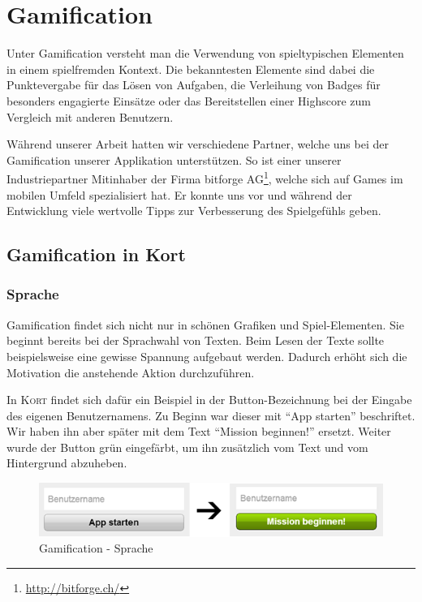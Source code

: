 \chapter{Gamification}
\label{gamification}

Unter Gamification versteht man die Verwendung von spieltypischen Elementen in einem spielfremden Kontext.
Die bekanntesten Elemente sind dabei die Punktevergabe für das Lösen von Aufgaben, die Verleihung von Badges für besonders engagierte Einsätze oder das Bereitstellen einer Highscore zum Vergleich mit anderen Benutzern.

Während unserer Arbeit hatten wir verschiedene Partner, welche uns bei der Gamification unserer Applikation unterstützen.
So ist einer unserer Industriepartner Mitinhaber der Firma bitforge AG\footnote{\url{http://bitforge.ch/}}, welche sich auf Games im mobilen Umfeld spezialisiert hat.
Er konnte uns vor und während der Entwicklung viele wertvolle Tipps zur Verbesserung des Spielgefühls geben.

\section{Gamification in Kort}
\subsection{Sprache}
Gamification findet sich nicht nur in schönen Grafiken und Spiel-Elementen.
Sie beginnt bereits bei der Sprachwahl von Texten.
Beim Lesen der Texte sollte beispielsweise eine gewisse Spannung aufgebaut werden.
Dadurch erhöht sich die Motivation die anstehende Aktion durchzuführen.

In \textsc{Kort} findet sich dafür ein Beispiel in der Button-Bezeichnung bei der Eingabe des eigenen Benutzernamens.
Zu Beginn war dieser mit "`App starten"' beschriftet.
Wir haben ihn aber später mit dem Text "`Mission beginnen!"' ersetzt.
Weiter wurde der Button grün eingefärbt, um ihn zusätzlich vom Text und vom Hintergrund abzuheben.

\begin{figure}[H]
	\centering
	\includegraphics{images/gamification/gamification-lang-firststeps}
	\caption{Gamification - Sprache}
	\label{gamification-lang-firststeps}
\end{figure}

